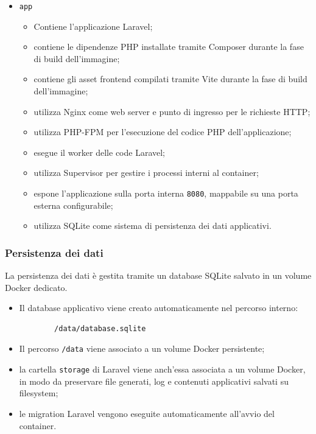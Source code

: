 \documentclass[a4paper,10pt]{article}
\begin{document}
\begin{itemize}
    \item \texttt{app}
        \begin{itemize}
            \item Contiene l'applicazione Laravel;
            \item contiene le dipendenze PHP installate tramite Composer durante la fase di build dell'immagine;
            \item contiene gli asset frontend compilati tramite Vite durante la fase di build dell'immagine;
            \item utilizza Nginx come web server e punto di ingresso per le richieste HTTP;
            \item utilizza PHP-FPM per l'esecuzione del codice PHP dell'applicazione;
            \item esegue il worker delle code Laravel;
            \item utilizza Supervisor per gestire i processi interni al container;
            \item espone l'applicazione sulla porta interna \texttt{8080}, mappabile su una porta esterna configurabile;
            \item utilizza SQLite come sistema di persistenza dei dati applicativi.
        \end{itemize}
\end{itemize}

\subsubsection{Persistenza dei dati}
La persistenza dei dati è gestita tramite un database SQLite salvato in un volume Docker dedicato.

\begin{itemize}
    \item Il database applicativo viene creato automaticamente nel percorso interno:
        \begin{lstlisting}
        /data/database.sqlite
        \end{lstlisting}
    \item Il percorso \texttt{/data} viene associato a un volume Docker persistente;
    \item la cartella \texttt{storage} di Laravel viene anch'essa associata a un volume Docker, in modo da preservare file generati, log e contenuti applicativi salvati su filesystem;
    \item le migration Laravel vengono eseguite automaticamente all'avvio del container.
\end{itemize}
\end{document}
